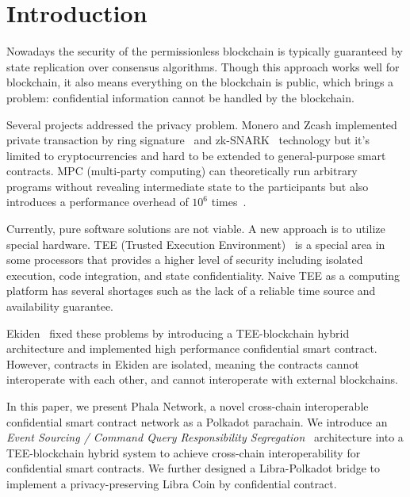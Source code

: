 \section{Introduction}

Nowadays the security of the permissionless blockchain is typically guaranteed by state replication over consensus algorithms. Though this approach works well for blockchain, it also means everything on the blockchain is public, which brings a problem: confidential information cannot be handled by the blockchain.

Several projects addressed the privacy problem. Monero and Zcash implemented private transaction by ring signature~\cite{monero} and zk-SNARK~\cite{zcash} technology but it's limited to cryptocurrencies and hard to be extended to general-purpose smart contracts. MPC (multi-party computing) can theoretically run arbitrary programs without revealing intermediate state to the participants but also introduces a performance overhead of $10^6$ times~\cite{cheng2019ekiden}.

Currently, pure software solutions are not viable. A new approach is to utilize special hardware. TEE (Trusted Execution Environment)~\cite{teewiki} is a special area in some processors that provides a higher level of security including isolated execution, code integration, and state confidentiality. Naive TEE as a computing platform has several shortages such as the lack of a reliable time source and availability guarantee.

Ekiden~\cite{cheng2019ekiden} fixed these problems by introducing a TEE-blockchain hybrid architecture and implemented high performance confidential smart contract. However, contracts in Ekiden are isolated, meaning the contracts cannot interoperate with each other, and cannot interoperate with external blockchains.

In this paper, we present Phala Network, a novel cross-chain interoperable confidential smart contract network as a Polkadot parachain. We introduce an \textit{Event Sourcing / Command Query Responsibility Segregation}~\cite{eventsourcing, cqrs} architecture into a TEE-blockchain hybrid system to achieve cross-chain interoperability for confidential smart contracts. We further designed a Libra-Polkadot bridge to implement a privacy-preserving Libra Coin by confidential contract.
